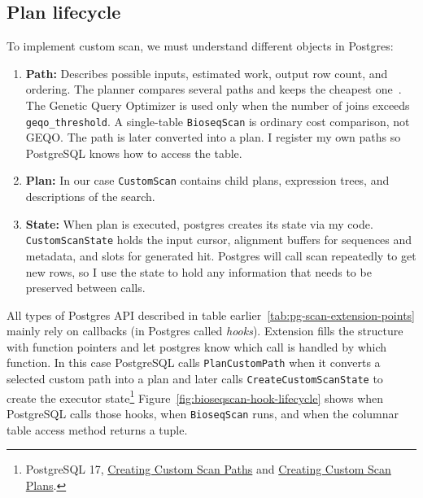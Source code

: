 \subsection{Plan lifecycle}
\label{sec:planner-support-and-ownership}
\label{sec:custom-path-plan-lifecycle}

To implement custom scan, we must understand different objects in Postgres:
\begin{enumerate}
  \item \textbf{Path:} Describes
    possible inputs, estimated work, output row count, and ordering. The
    planner compares several paths and keeps the cheapest one~\autocite{postgresql_planner_optimizer}\autocite{conway_postgres_optimizer}.
    The Genetic Query Optimizer is used only when the number of joins exceeds \texttt{geqo\_threshold}.
    A single-table \texttt{BioseqScan} is ordinary cost comparison, not GEQO.
    The path is later converted into a plan. I register my own paths so PostgreSQL knows how to access the table.
  \item \textbf{Plan:} In our case \texttt{CustomScan} contains child plans, expression trees, and descriptions of the
    search.
  \item \textbf{State:} When plan is executed, postgres creates its state via my code. \texttt{CustomScanState} holds the input cursor, alignment
    buffers for sequences and metadata, and slots for generated hit.
    Postgres will call scan repeatedly to get new rows, so I use the state to hold any information that needs to be preserved between calls.
\end{enumerate}

All types of Postgres API described in table earlier~\ref{tab:pg-scan-extension-points} mainly rely on callbacks (in Postgres called \emph{hooks}). Extension fills the structure with function pointers and let postgres know which call is handled by which function.
In this case PostgreSQL calls \texttt{PlanCustomPath} when it converts a selected custom
path into a plan and later calls \texttt{CreateCustomScanState} to create the
executor state\footnote{PostgreSQL
17, \href{https://www.postgresql.org/docs/17/custom-scan-path.html}
{Creating Custom Scan Paths} and
\href{https://www.postgresql.org/docs/17/custom-scan-plan.html}
{Creating Custom Scan Plans}.}
Figure~\ref{fig:bioseqscan-hook-lifecycle} shows when PostgreSQL calls those hooks, when \texttt{BioseqScan} runs, and when the columnar table access method returns a tuple.

